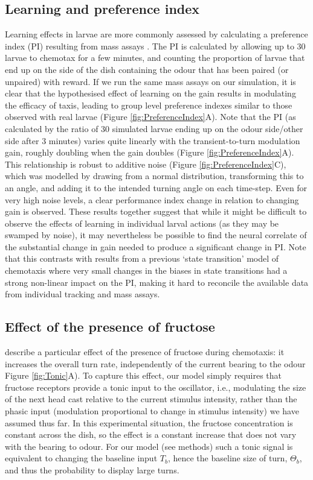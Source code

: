 \documentclass[11pt,a4paper]{article}
\begin{document}
\subsection{Learning and preference index}
Learning effects in larvae are more commonly assessed by calculating a preference index (PI) resulting from mass assays \citep{gerber2009smelling}. The PI is calculated by allowing up to 30 larvae to chemotax for a few minutes, and counting the proportion of larvae that end up on the side of the dish containing the odour that has been paired (or unpaired) with reward. If we run the same mass assays on our simulation, it is clear that the hypothesised effect of learning on the gain results in modulating the efficacy of taxis, leading to group level preference indexes similar to those observed with real larvae (Figure \ref{fig:PreferenceIndex}A). Note that the PI (as calculated by the ratio of 30 simulated larvae ending up on the odour side/other side after 3 minutes) varies quite linearly with the transient-to-turn modulation gain, roughly doubling when the gain doubles (Figure \ref{fig:PreferenceIndex}A).
 This relationship is robust to additive noise (Figure \ref{fig:PreferenceIndex}C), which was modelled by drawing from a normal distribution, transforming this to an angle, and adding it to the intended turning angle on each time-step.
  Even for very high noise levels, a clear performance index change in relation to changing gain is observed. These results together suggest that while it might be difficult to observe the effects of learning in individual larval actions (as they may be swamped by noise), it may nevertheless be possible to find the neural correlate of the substantial change in gain needed to produce a significant change in PI.
Note that this contrasts with results from a previous `state transition' model of chemotaxis \citep{davies2015model} where very small changes in the biases in state transitions had a strong non-linear impact on the PI, making it hard to reconcile the available data from individual tracking and mass assays.

\subsection{Effect of the presence of fructose}
\cite{schleyer2015learning} describe a particular effect of the presence of fructose during chemotaxis: it increases the overall turn rate, independently of the current bearing to the odour Figure \ref{fig:Tonic}A). To capture this effect, our model simply requires that fructose receptors provide a tonic input to the oscillator, i.e., modulating the size of the next head cast relative to the current stimulus intensity, rather than the phasic input (modulation proportional to change in stimulus intensity) we have assumed thus far. In this experimental situation, the fructose concentration is constant across the dish, so the effect is a constant increase that does not vary with the bearing to odour. For our model (see methods) such a tonic signal is equivalent to changing the baseline input $T_b$, hence the baseline size of turn, $\Theta_b$, and thus the probability to display large turns. 
\end{document}
